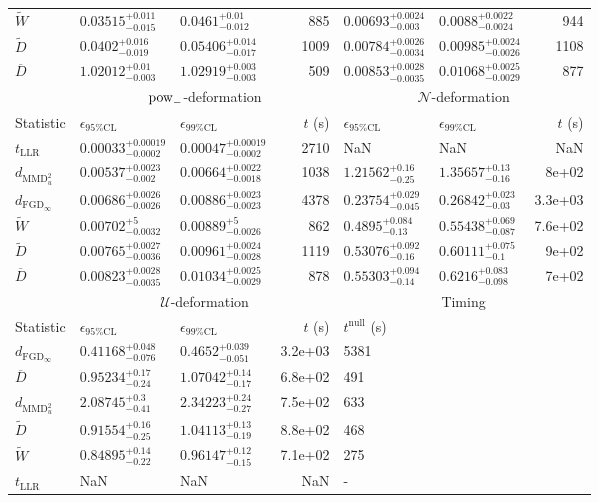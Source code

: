 \begin{tabular}{l|llr|llr}
	$\widetilde{W}$ & $0.03515_{-0.015}^{+0.011}$ & $0.0461_{-0.012}^{+0.01}$ & 885 & $0.00693_{-0.003}^{+0.0024}$ & $0.0088_{-0.0024}^{+0.0022}$ & 944 \\
	$\widetilde{D}$ & $0.0402_{-0.019}^{+0.016}$ & $0.05406_{-0.017}^{+0.014}$ & 1009 & $0.00784_{-0.0034}^{+0.0026}$ & $0.00985_{-0.0026}^{+0.0024}$ & 1108 \\
	$\overline{D}$ & $1.02012_{-0.003}^{+0.01}$ & $1.02919_{-0.003}^{+0.003}$ & 509 & $0.00853_{-0.0035}^{+0.0028}$ & $0.01068_{-0.0029}^{+0.0025}$ & 877 \\
	\toprule
	\multicolumn{1}{c}{} & \multicolumn{3}{c}{$\rm{pow}_{-}$-deformation} & \multicolumn{3}{c}{$\mathcal{N}$-deformation} \\
	Statistic & $\epsilon_{95\%\mathrm{CL}}$ & $\epsilon_{99\%\mathrm{CL}}$ & $t$ (s) & $\epsilon_{95\%\mathrm{CL}}$ & $\epsilon_{99\%\mathrm{CL}}$ & $t$ (s) \\
	\midrule
	$t_{\mathrm{LLR}}$ & $0.00033_{-0.0002}^{+0.00019}$ & $0.00047_{-0.0002}^{+0.00019}$ & 2710 & NaN & NaN & NaN \\
	$d_{\mathrm{MMD}^{2}_{u}}$ & $0.00537_{-0.002}^{+0.0023}$ & $0.00664_{-0.0018}^{+0.0022}$ & 1038 & $1.21562_{-0.25}^{+0.16}$ & $1.35657_{-0.16}^{+0.13}$ & 8e+02 \\
	$d_{\mathrm{FGD}_{\infty}}$ & $0.00686_{-0.0026}^{+0.0026}$ & $0.00886_{-0.0023}^{+0.0023}$ & 4378 & $0.23754_{-0.045}^{+0.029}$ & $0.26842_{-0.03}^{+0.023}$ & 3.3e+03 \\
	$\widetilde{W}$ & $0.00702_{-0.0032}^{+5}$ & $0.00889_{-0.0026}^{+5}$ & 862 & $0.4895_{-0.13}^{+0.084}$ & $0.55438_{-0.087}^{+0.069}$ & 7.6e+02 \\
	$\widetilde{D}$ & $0.00765_{-0.0036}^{+0.0027}$ & $0.00961_{-0.0028}^{+0.0024}$ & 1119 & $0.53076_{-0.16}^{+0.092}$ & $0.60111_{-0.1}^{+0.075}$ & 9e+02 \\
	$\overline{D}$ & $0.00823_{-0.0035}^{+0.0028}$ & $0.01034_{-0.0029}^{+0.0025}$ & 878 & $0.55303_{-0.14}^{+0.094}$ & $0.6216_{-0.098}^{+0.083}$ & 7e+02 \\
	\toprule
	\multicolumn{1}{c}{} & \multicolumn{3}{c}{$\mathcal{U}$-deformation} & \multicolumn{3}{c}{Timing} \\
	Statistic & $\epsilon_{95\%\mathrm{CL}}$ & $\epsilon_{99\%\mathrm{CL}}$ & $t$ (s) & $t^{\mathrm{null}}$ (s) \\
	\midrule
	$d_{\mathrm{FGD}_{\infty}}$ & $0.41168_{-0.076}^{+0.048}$ & $0.4652_{-0.051}^{+0.039}$ & 3.2e+03 & 5381 \\
	$\overline{D}$ & $0.95234_{-0.24}^{+0.17}$ & $1.07042_{-0.17}^{+0.14}$ & 6.8e+02 & 491 \\
	$d_{\mathrm{MMD}^{2}_{u}}$ & $2.08745_{-0.41}^{+0.3}$ & $2.34223_{-0.27}^{+0.24}$ & 7.5e+02 & 633 \\
	$\widetilde{D}$ & $0.91554_{-0.25}^{+0.16}$ & $1.04113_{-0.19}^{+0.13}$ & 8.8e+02 & 468 \\
	$\widetilde{W}$ & $0.84895_{-0.22}^{+0.14}$ & $0.96147_{-0.15}^{+0.12}$ & 7.1e+02 & 275 \\
	$t_{\mathrm{LLR}}$ & NaN & NaN & NaN & - \\
	\bottomrule
\end{tabular}